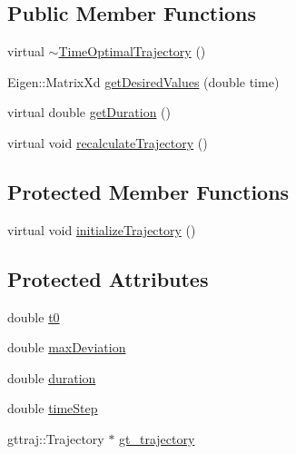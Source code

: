 \subsection*{Public Member Functions}
\begin{DoxyCompactItemize}
\item 
virtual \hyperlink{classocra_1_1TimeOptimalTrajectory_a4f4e9ce2cd5b313d8418893d89b5cc8f}{$\sim$\+Time\+Optimal\+Trajectory} ()
\item 
Eigen\+::\+Matrix\+Xd \hyperlink{classocra_1_1TimeOptimalTrajectory_a42ca0b579494ac0c3c4c842896e592f9}{get\+Desired\+Values} (double time)
\item 
virtual double \hyperlink{classocra_1_1TimeOptimalTrajectory_a561d2d6ad9c40c88783265a91193a0ab}{get\+Duration} ()
\item 
virtual void \hyperlink{classocra_1_1TimeOptimalTrajectory_ad70bc612f62abacf2fb457aa5c6d635a}{recalculate\+Trajectory} ()
\end{DoxyCompactItemize}
\subsection*{Protected Member Functions}
\begin{DoxyCompactItemize}
\item 
virtual void \hyperlink{classocra_1_1TimeOptimalTrajectory_a1ddd759810abea6db2462dca3aae585c}{initialize\+Trajectory} ()
\end{DoxyCompactItemize}
\subsection*{Protected Attributes}
\begin{DoxyCompactItemize}
\item 
double \hyperlink{classocra_1_1TimeOptimalTrajectory_a7c58d1493c4227bb5d209de36ade154e}{t0}
\item 
double \hyperlink{classocra_1_1TimeOptimalTrajectory_a7709c9a5e8ab5e48657cc965f59d0f57}{max\+Deviation}
\item 
double \hyperlink{classocra_1_1TimeOptimalTrajectory_a6c6b5ffec595af24fd0061d47f85ebdf}{duration}
\item 
double \hyperlink{classocra_1_1TimeOptimalTrajectory_aacee4e110122959c3f47c07a9b7796bf}{time\+Step}
\item 
gttraj\+::\+Trajectory $\ast$ \hyperlink{classocra_1_1TimeOptimalTrajectory_a350a0c047e3f65fc7dd55d6b5dfa5796}{gt\+\_\+trajectory}
\end{DoxyCompactItemize}


